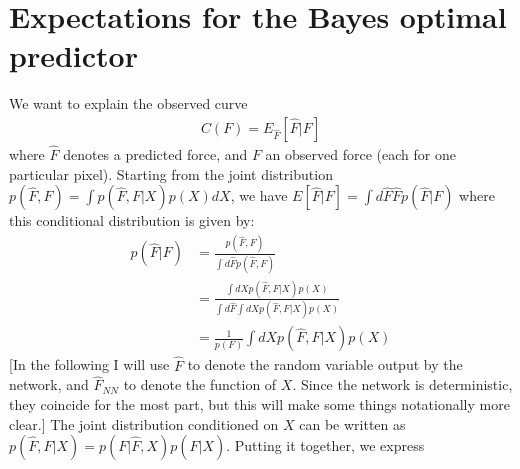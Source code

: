\documentclass{article}
\begin{document}
\section{Expectations for the Bayes optimal predictor}
We want to explain the observed curve 
\begin{align}
    C(F)=E_{\hat F}[\hat F | F]
\end{align}
where $\hat F$ denotes a predicted force, and $F$ an observed force (each for one particular pixel).
Starting from the joint distribution $p(\hat F, F) = \int p(\hat F, F|X)p(X)dX$, we have
$E[\hat F | F] = \int d\hat F \hat F p(\hat F | F)$ where this conditional distribution is given by:
\begin{align}
    p(\hat F| F) &= \frac{p(\hat F, F)}{\int d\hat F p(\hat F, F)}
    \\
    &= \frac{\int dX p(\hat F, F|X)p(X)}{\int d\hat F\int dX  p(\hat F, F|X)p(X)}
    \\
    &= \frac{1}{p(F)}\int dX p(\hat F, F|X)p(X)
\end{align}
[In the following I will use $\hat F$ to denote the random variable output by the network, and $\hat F_{NN}$ to denote the function of $X$. Since the network is deterministic, they coincide for the most part, but this will make some things notationally more clear.]
The joint distribution conditioned on $X$ can be written as $p(\hat F, F|X)=p(F |\hat F, X)p(\hat F|X) $.
Putting it together, we express
\end{document}
